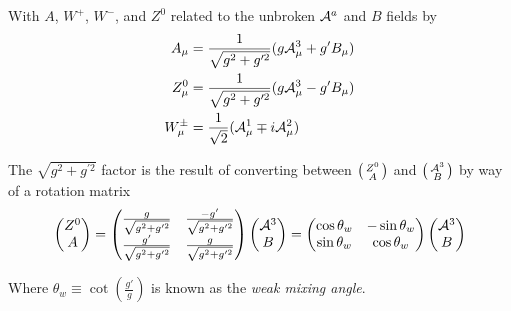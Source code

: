         With $A$, $W^+$, $W^-$, and $Z^0$ related to the unbroken $\mathcal{A}^a$ and $B$ fields by
        \begin{equation} \begin{split}
            A_{\mu} & = \frac{1}{\sqrt{g^2 + g^{\prime 2}}} ( g\mathcal{A}^3_{\mu} + g'B_{\mu} ) \\
            Z^0_{\mu} & = \frac{1}{\sqrt{g^2 + g^{\prime 2}}} ( g\mathcal{A}^3_{\mu} - g'B_{\mu} ) \\
            W^{\pm}_{\mu} & = \frac{1}{\sqrt{2}} (\mathcal{A}^1_{\mu} \mp i\mathcal{A}^2_{\mu})
        \end{split} \end{equation}

        The $\sqrt{g^2 + g^{\prime 2}}$ factor is the result of converting between
            $\big(\begin{smallmatrix} Z^0 \\ A \end{smallmatrix}\big)$ and $\big(\begin{smallmatrix} \mathcal{A}^3 \\ B \end{smallmatrix}\big)$ by way of a rotation matrix
        \begin{equation} \begin{split}
            \begin{pmatrix} Z^0 \\ A \end{pmatrix} =
            \begin{pmatrix}
                \frac{g}{\sqrt{g^2 + g^{\prime 2}}} & \frac{-g'}{\sqrt{g^2 + g^{\prime 2}}} \\
                \frac{g'}{\sqrt{g^2 + g^{\prime 2}}} & \frac{g}{\sqrt{g^2 + g^{\prime 2}}}
            \end{pmatrix} \begin{pmatrix} \mathcal{A}^3 \\ B \end{pmatrix} = 
            \begin{pmatrix}
                \cos\theta_w & -\sin\theta_w \\
                \sin\theta_w & \cos\theta_w
            \end{pmatrix} \begin{pmatrix} \mathcal{A}^3 \\ B \end{pmatrix}
        \end{split} \end{equation}

        Where $\theta_w \equiv \cot(\frac{g'}{g})$ is known as the \textit{weak mixing angle}.


